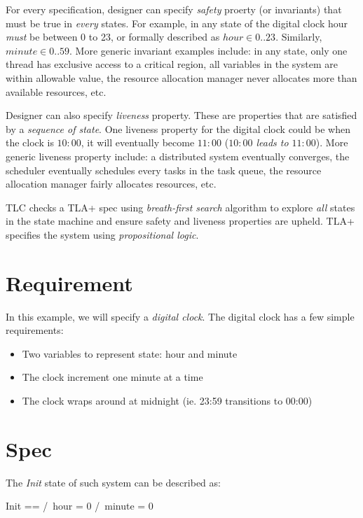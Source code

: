 \documentclass{report}
\begin{document}
For every specification, designer can specify \textit{safety} proerty (or
invariants) that must be true in \textit{every} states. For example, in any
state of the digital clock hour \textit{must} be between 0 to 23, or formally
described as $hour \in 0..23$.  Similarly, $minute \in 0..59$. More generic
invariant examples include: in any state, only one thread has exclusive access
to a critical region, all variables in the system are within allowable value,
the resource allocation manager never allocates more than available resources,
etc. \newline

Designer can also specify \textit{liveness} property. These are properties that
are satisfied by a \textit{sequence of state}. One liveness property for the
digital clock could be when the clock is $10:00$, it will eventually become
$11:00$ (\textit{$10:00$ leads to $11:00$}). More generic liveness property
include: a distributed system eventually converges, the scheduler eventually
schedules every tasks in the task queue, the resource allocation manager fairly
allocates resources, etc. \newline

TLC checks a TLA+ spec using \textit{breath-first search} algorithm to explore
\textit{all} states in the state machine and ensure safety and liveness
properties are upheld. TLA+ specifies the system using \textit{propositional
logic}. 

\section{Requirement}

In this example, we will specify a \textit{digital clock}. The digital clock has
a few simple requirements:
\begin{itemize}
    \item Two variables to represent state: hour and minute
    \item The clock increment one minute at a time
    \item The clock wraps around at midnight (ie. 23:59 transitions to 00:00)
\end{itemize}

\section{Spec}

The \textit{Init} state of such system can be described as: \newline
\begin{tla}
    Init ==
        /\ hour = 0
        /\ minute = 0
\end{tla}
\begin{tlatex}
%
%
%
\end{tlatex}
 \newline
\end{document}

